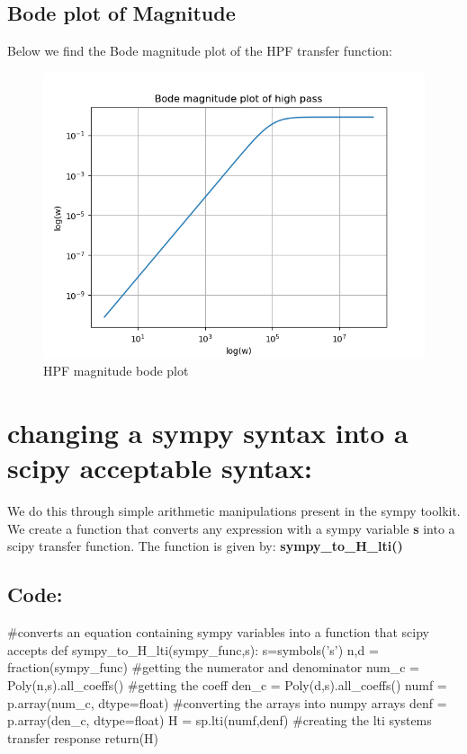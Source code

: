 \documentclass[11pt]{article}
\begin{document}
\subsection{Bode plot of Magnitude}
Below we find the Bode magnitude plot of the HPF transfer function:

\begin{figure}[H]
    \centering
    \includegraphics[scale = 1]{Figure_5.png}
    \caption{HPF magnitude bode plot}
\end{figure}

\section{changing a sympy syntax into a scipy acceptable syntax:}
We do this through simple arithmetic manipulations present in the sympy toolkit. We create a function that converts any expression with a sympy variable \textbf{s} into a scipy transfer function. The function is given by: \textbf{sympy\_to\_H\_lti()}

\subsection{Code:}
\begin{python}
#converts an equation containing sympy variables into a function that scipy accepts
def sympy_to_H_lti(sympy_func,s):
	s=symbols('s')
	n,d = fraction(sympy_func)	#getting the numerator and denominator
	num_c = Poly(n,s).all_coeffs()	#getting the coeff
	den_c = Poly(d,s).all_coeffs()
	numf = p.array(num_c, dtype=float)	#converting the arrays into numpy arrays
	denf = p.array(den_c, dtype=float)
	H = sp.lti(numf,denf)	#creating the lti systems transfer response
	return(H)
\end{python}
\end{document}
